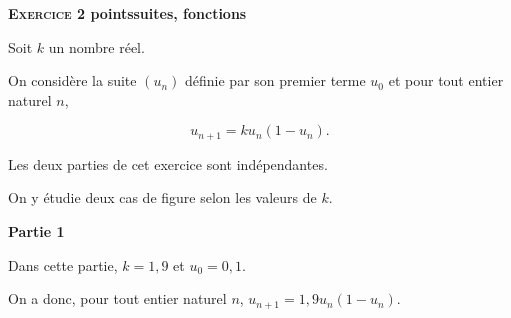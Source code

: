 \documentclass[10pt,a4paper]{article}
\begin{document}
\bigskip

\textbf{\textsc{Exercice 2}  points\hfill suites, fonctions}

\medskip

Soit $k$ un nombre réel.

On considère la suite $\left(u_n\right)$ définie par son premier terme $u_0$ et pour tout entier naturel $n$,

\[u_{n+1} = ku_n\left(1- u_n\right).\]

Les deux parties de cet exercice sont indépendantes.

On y étudie deux cas de figure selon les valeurs de $k$.

\bigskip

\textbf{Partie 1}

\medskip

Dans cette partie, $k = 1,9$ et $u_0 = 0,1$.

On a donc, pour tout entier naturel $n$,\: $u_{n+1} = 1,9u_n\left(1 - u_n\right)$.

\medskip
\end{document}
